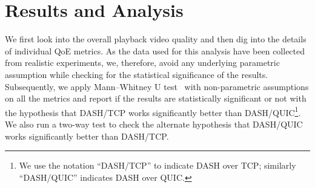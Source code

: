 \section{Results and Analysis}
We first look into the overall playback video quality and then dig into the details of individual QoE metrics. As the data used for this analysis have been collected from realistic experiments, we, therefore, avoid any underlying parametric assumption while checking for the statistical significance of the results. Subsequently, we apply Mann–Whitney U test~\cite{mannwhitney} with non-parametric assumptions on all the metrics and report if the results are statistically significant or not with the hypothesis that DASH/TCP works significantly better than DASH/QUIC\footnote{We use the notation ``DASH/TCP'' to indicate DASH over TCP; similarly ``DASH/QUIC'' indicates DASH over QUIC.}. We also run a two-way test to check the alternate hypothesis that DASH/QUIC works significantly better than DASH/TCP.





